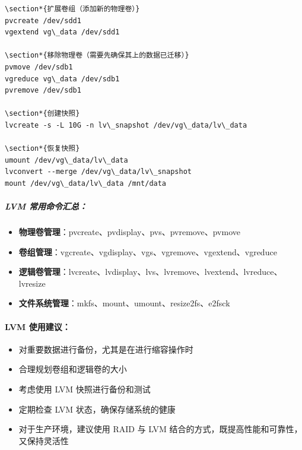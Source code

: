 \documentclass[12pt,UTF8]{ctexbook}
\begin{document}
\begin{verbatim}
\section*{扩展卷组（添加新的物理卷）}
pvcreate /dev/sdd1
vgextend vg\_data /dev/sdd1

\section*{移除物理卷（需要先确保其上的数据已迁移）}
pvmove /dev/sdb1
vgreduce vg\_data /dev/sdb1
pvremove /dev/sdb1

\section*{创建快照}
lvcreate -s -L 10G -n lv\_snapshot /dev/vg\_data/lv\_data

\section*{恢复快照}
umount /dev/vg\_data/lv\_data
lvconvert --merge /dev/vg\_data/lv\_snapshot
mount /dev/vg\_data/lv\_data /mnt/data
\end{verbatim}

\subparagraph{LVM 常用命令汇总：}
\begin{itemize}
    \item \textbf{物理卷管理}：pvcreate、pvdisplay、pvs、pvremove、pvmove
    \item \textbf{卷组管理}：vgcreate、vgdisplay、vgs、vgremove、vgextend、vgreduce
    \item \textbf{逻辑卷管理}：lvcreate、lvdisplay、lvs、lvremove、lvextend、lvreduce、lvresize
    \item \textbf{文件系统管理}：mkfs、mount、umount、resize2fs、e2fsck
\end{itemize}

\paragraph{LVM 使用建议：}
\begin{itemize}
    \item 对重要数据进行备份，尤其是在进行缩容操作时
    \item 合理规划卷组和逻辑卷的大小
    \item 考虑使用 LVM 快照进行备份和测试
    \item 定期检查 LVM 状态，确保存储系统的健康
    \item 对于生产环境，建议使用 RAID 与 LVM 结合的方式，既提高性能和可靠性，又保持灵活性
\end{itemize}
\end{document}

